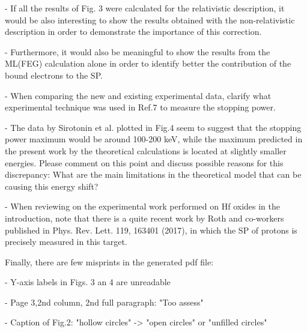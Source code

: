 - If all the results of Fig. 3 were calculated for the relativistic
description, it would be also interesting to show the results obtained
with the non-relativistic description in order to demonstrate the
importance of this correction.

- Furthermore, it would also be meaningful to show the results from
the ML(FEG) calculation alone in order to identify better the
contribution of the bound electrons to the SP.

- When comparing the new and existing experimental data, clarify what
experimental technique was used in Ref.7 to measure the stopping
power.

- The data by Sirotonin et al. plotted in Fig.4 seem to suggest that
the stopping power maximum would be around 100-200 keV, while the
maximum predicted in the present work by the theoretical calculations
is located at slightly smaller energies. Please comment on this point
and discuss possible reasons for this discrepancy: What are the main
limitations in the theoretical model that can be causing this energy
shift?

- When reviewing on the experimental work performed on Hf oxides in
the introduction, note that there is a quite recent work by Roth and
co-workers published in Phys. Rev. Lett. 119, 163401 (2017), in which
the SP of protons is precisely measured in this target.

Finally, there are few misprints in the generated pdf file:

- Y-axis labels in Figs. 3 an 4 are unreadable

- Page 3,2nd column, 2nd full paragraph: "Too assess"

- Caption of Fig.2: "hollow circles" -> "open circles" or "unfilled
circles"
